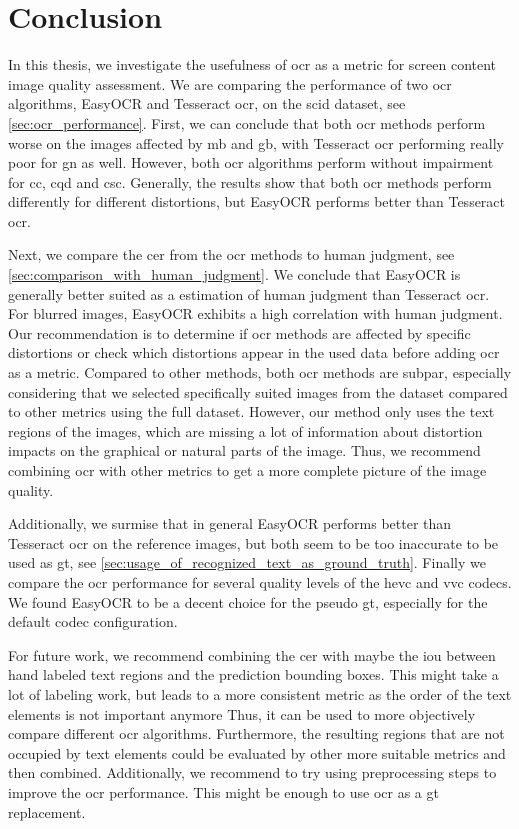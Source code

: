 \chapter{Conclusion}
\label{chap:conclusion}

In this thesis, we investigate the usefulness of \gls{ocr} as a metric for screen content image quality assessment.
We are comparing the performance of two \gls{ocr} algorithms, EasyOCR and Tesseract \gls{ocr}, on the \gls{scid} dataset, see \autoref{sec:ocr_performance}.
First, we can conclude that both \gls{ocr} methods perform worse on the images affected by \gls{mb} and \gls{gb}, with Tesseract \gls{ocr} performing really poor for \gls{gn} as well.
However, both \gls{ocr} algorithms perform without impairment for \gls{cc}, \gls{cqd} and \gls{csc}.
Generally, the results show that both \gls{ocr} methods perform differently for different distortions, but EasyOCR performs better than Tesseract \gls{ocr}.


Next, we compare the \gls{cer} from the \gls{ocr} methods to human judgment, see \autoref{sec:comparison_with_human_judgment}.
We conclude that EasyOCR is generally better suited as a estimation of human judgment than Tesseract \gls{ocr}.
For blurred images, EasyOCR exhibits a high correlation with human judgment.
Our recommendation is to determine if \gls{ocr} methods are affected by specific distortions or check which distortions appear in the used data before adding \gls{ocr} as a metric.
Compared to other methods, both \gls{ocr} methods are subpar, especially considering that we selected specifically suited images from the dataset compared to other metrics using the full dataset.
However, our method only uses the text regions of the images, which are missing a lot of information about distortion impacts on the graphical or natural parts of the image.
Thus, we recommend combining \gls{ocr} with other metrics to get a more complete picture of the image quality.

Additionally, we surmise that in general EasyOCR performs better than Tesseract \gls{ocr} on the reference images, but both seem to be too inaccurate to be used as \gls{gt}, see \autoref{sec:usage_of_recognized_text_as_ground_truth}.
Finally we compare the \gls{ocr} performance for several quality levels of the \gls{hevc} and \gls{vvc} codecs.
We found EasyOCR to be a decent choice for the pseudo \gls{gt}, especially for the default codec configuration.


For future work, we recommend combining the \gls{cer} with maybe the \gls{iou} between hand labeled text regions and the prediction bounding boxes.
This might take a lot of labeling work, but leads to a more consistent metric as the order of the text elements is not important anymore
Thus, it can be used to more objectively compare different \gls{ocr} algorithms.
Furthermore, the resulting regions that are not occupied by text elements could be evaluated by other more suitable metrics and then combined.
Additionally, we recommend to try using preprocessing steps to improve the \gls{ocr} performance.
This might be enough to use \gls{ocr} as a \gls{gt} replacement.
